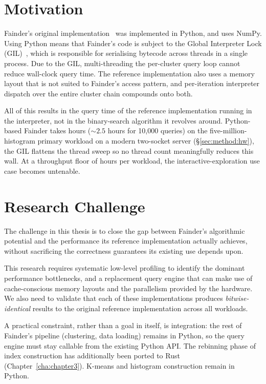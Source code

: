\section{Motivation\label{sec:moti}}

Fainder's original implementation~\cite{behme_2024} was implemented in Python, and uses NumPy. Using Python means that Fainder's code is subject to the Global Interpreter Lock (GIL)~\cite{cpython_gil}, which is responsible for serialising bytecode across threads in a single process. Due to the GIL, multi-threading the per-cluster query loop cannot reduce wall-clock query time. The reference implementation also uses a memory layout that is not suited to Fainder's access pattern, and per-iteration interpreter dispatch over the entire cluster chain compounds onto both.

All of this results in the query time of the reference implementation running in the interpreter, not in the binary-search algorithm it revolves around. Python-based Fainder takes hours ($\sim 2.5$ hours for 10,000 queries) on the five-million-histogram primary workload on a modern two-socket server (§\ref{sec:method:hw}), the GIL flattens the thread sweep so no thread count meaningfully reduces this wall. At a throughput floor of hours per workload, the interactive-exploration use case becomes untenable.


\section{Research Challenge\label{sec:objective}}

The challenge in this thesis is to close the gap between Fainder's algorithmic potential and the performance its reference implementation actually achieves, without sacrificing the correctness guarantees its existing use depends upon.

This research requires systematic low-level profiling to identify the dominant performance bottlenecks, and a replacement query engine that can make use of cache-conscious memory layouts and the parallelism provided by the hardware. We also need to validate that each of these implementations produces \emph{bitwise-identical} results to the original reference implementation across all workloads.

A practical constraint, rather than a goal in itself, is integration: the rest of Fainder's pipeline (clustering, data loading) remains in Python, so the query engine must stay callable from the existing Python API. The rebinning phase of index construction has additionally been ported to Rust (Chapter~\ref{cha:chapter3}). K-means and histogram construction remain in Python.

